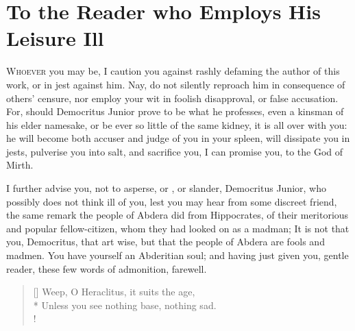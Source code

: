 \chapter{To the Reader who Employs His Leisure Ill}
{\lettrine[image,lines=5,findent=5pt,nindent=0pt]{W}{hoever} you may be, I caution you against rashly defaming the author of
this work, or  in jest against him. Nay, do not silently
reproach him in consequence of others' censure, nor employ your wit in
foolish disapproval, or false accusation. For, should Democritus Junior
prove to be what he professes, even a kinsman of his elder namesake, or
be ever so little of the same kidney, it is all over with you: he will
become both accuser and judge of you in your spleen, will dissipate you
in jests, pulverise you into salt, and sacrifice you, I can promise
you, to the God of Mirth.

I further advise you, not to asperse, or , or slander,
Democritus Junior, who possibly does not think ill of you, lest you may
hear from some discreet friend, the same remark the people of Abdera
did from Hippocrates, of their meritorious and popular fellow-citizen,
whom they had looked on as a madman; It is not that you, Democritus,
that art wise, but that the people of Abdera are fools and madmen. You
have yourself an Abderitian soul; and having just given you, gentle
reader, these few words of admonition, farewell.

%
%
%
%
%
%
\settowidth{\versewidth}{A thousand Heraclitus', a thousand Democritus' are required.}
\begin{verse}[\versewidth]
Weep, O Heraclitus, it suits the age,\\*
Unless you see nothing base, nothing sad.\\!


\end{verse}}

